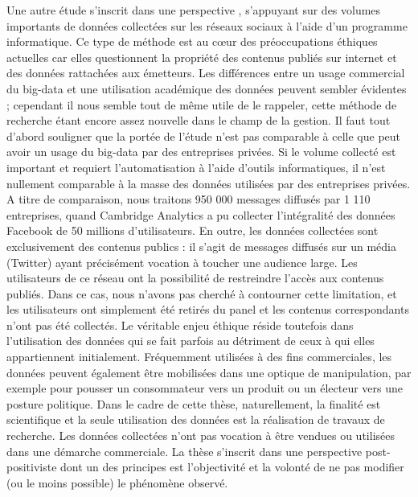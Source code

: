 Une autre étude s’inscrit dans une perspective , s’appuyant sur des volumes importants de données collectées sur les réseaux sociaux à l’aide d’un programme informatique. Ce type de méthode est au cœur des préoccupations éthiques actuelles car elles questionnent la propriété des contenus publiés sur internet et des données rattachées aux émetteurs. Les différences entre un usage commercial du big-data et une utilisation académique des données peuvent sembler évidentes ; cependant il nous semble tout de même utile de le rappeler, cette méthode de recherche étant encore assez nouvelle dans le champ de la gestion. Il faut tout d’abord souligner que la portée de l’étude n’est pas comparable à celle que peut avoir un usage du big-data par des entreprises privées. Si le volume collecté est important et requiert l’automatisation à l’aide d’outils informatiques, il n’est nullement comparable à la masse des données utilisées par des entreprises privées. A titre de comparaison, nous traitons 950 000 messages diffusés par 1 110 entreprises, quand Cambridge Analytics a pu collecter l’intégralité des données Facebook de 50 millions d’utilisateurs. En outre, les données collectées sont exclusivement des contenus publics : il s’agit de messages diffusés sur un média (Twitter) ayant précisément vocation à toucher une audience large. Les utilisateurs de ce réseau ont la possibilité de restreindre l’accès aux contenus publiés. Dans ce cas, nous n'avons pas cherché à contourner cette limitation, et les utilisateurs ont simplement été retirés du panel et les contenus correspondants n’ont pas été collectés. Le véritable enjeu éthique réside toutefois dans l’utilisation des données qui se fait parfois au détriment de ceux à qui elles appartiennent initialement. Fréquemment utilisées à des fins commerciales, les données peuvent également être mobilisées dans une optique de manipulation, par exemple pour pousser un consommateur vers un produit ou un électeur vers une posture politique. Dans le cadre de cette thèse, naturellement, la finalité est scientifique et la seule utilisation des données est la réalisation de travaux de recherche. Les données collectées n’ont pas vocation à être vendues ou utilisées dans une démarche commerciale. La thèse s’inscrit dans une perspective post-positiviste dont un des principes est l’objectivité et la volonté de ne pas modifier (ou le moins possible) le phénomène observé.
